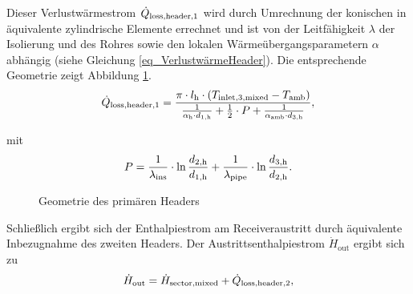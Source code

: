 Dieser Verlustwärmestrom $\dot{Q}_{\mathrm{loss,header,1}}$ wird durch Umrechnung der konischen in äquivalente zylindrische Elemente errechnet und ist von der Leitfähigkeit $\lambda$ der Isolierung und des Rohres sowie den lokalen Wärmeübergangsparametern $\alpha$ abhängig (siehe Gleichung \ref{eq_VerlustwärmeHeader}).
Die entsprechende Geometrie zeigt Abbildung \ref{fig_header}.
\begin{equation} \label{eq_VerlustwärmeHeader}
\dot{Q}_{\mathrm{loss,header,1}} = \frac{\pi \cdot l_{\mathrm{h}} \cdot\left(T_{\mathrm{inlet,3,mixed}}-T_{\text {amb}}\right)}
{\frac{1}{\alpha_{\mathrm{h}} \cdot d_{1, \mathrm{h}}}+\frac{1}{2} \cdot P+\frac{1}{\alpha_{\mathrm{amb}} \cdot d_{3, \mathrm{\mathrm{h}}}}},
\end{equation}

\vspace*{-\baselineskip}mit
\begin{equation} \label{eq_BestimmungHilfsgrößenHeader}
P=\frac{1}{\lambda_{\text {ins}}} \cdot \ln \frac{d_{2, \mathrm{h}}}{d_{1, \mathrm{h}}}+\frac{1}{\lambda_{\text {pipe}}} \cdot \ln \frac{d_{3, \mathrm{h}}}{d_{2, \mathrm{h}}}.
\end{equation}

\begin{figure}[h!]
    \centering
    \setlength{\fboxsep}{1pt}
    \setlength{\fboxrule}{1pt}
    \caption[Geometrie des primären Headers]{Geometrie des primären Headers \cite[S.97]{DissGall}}
    \label{fig_header}
\end{figure}

\newpage
Schließlich ergibt sich der Enthalpiestrom am Receiveraustritt durch äquivalente Inbezugnahme des zweiten Headers.
Der Austrittsenthalpiestrom $\dot{H}_{\mathrm{out}}$ ergibt sich zu
\begin{equation} \label{eq_Headerout1}
\dot{H}_{\mathrm{out}} = \dot{H}_{\mathrm{sector,mixed}} + \dot{Q}_{\mathrm{loss,header,2}},
\end{equation}

